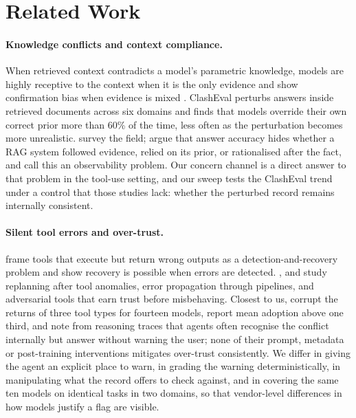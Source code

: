 \section{Related Work}
\label{sec:related}

\paragraph{Knowledge conflicts and context compliance.}
When retrieved context contradicts a model's parametric knowledge, models are highly receptive to the context when it is the only evidence and show confirmation bias when evidence is mixed \citep{xie2024adaptive}. ClashEval \citep{wu2024clasheval} perturbs answers inside retrieved documents across six domains and finds that models override their own correct prior more than 60\% of the time, less often as the perturbation becomes more unrealistic. \citet{xu2024knowledge} survey the field; \citet{chen2026doesrag} argue that answer accuracy hides whether a RAG system followed evidence, relied on its prior, or rationalised after the fact, and call this an observability problem. Our concern channel is a direct answer to that problem in the tool-use setting, and our sweep tests the ClashEval trend under a control that those studies lack: whether the perturbed record remains internally consistent.

\paragraph{Silent tool errors and over-trust.}
\citet{sun2024toolsfail} frame tools that execute but return wrong outputs as a detection-and-recovery problem and show recovery is possible when errors are detected. \citet{zhu2026whentools}, \citet{gurram2026auditing} and \citet{yan2026trustnotool} study replanning after tool anomalies, error propagation through pipelines, and adversarial tools that earn trust before misbehaving. Closest to us, \citet{yang2026agents} corrupt the returns of three tool types for fourteen models, report mean adoption above one third, and note from reasoning traces that agents often recognise the conflict internally but answer without warning the user; none of their prompt, metadata or post-training interventions mitigates over-trust consistently. We differ in giving the agent an explicit place to warn, in grading the warning deterministically, in manipulating what the record offers to check against, and in covering the same ten models on identical tasks in two domains, so that vendor-level differences in how models justify a flag are visible.

